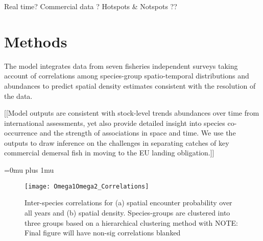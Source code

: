 \documentclass{nature}
\begin{document}
\begin{linenumbers}
Real time?  Commercial data ?  Hotspots \& Notspots ??

\section*{Methods}

The model integrates data from seven fisheries independent surveys taking
account of correlations among species-group spatio-temporal distributions and
abundances to predict spatial density estimates consistent with the resolution
of the data. 

[[Model outputs are consistent with stock-level trends abundances over time
from international assessments, yet also provide detailed insight into species
co-occurrence and the strength of associations in space and time.  We use the
outputs to draw inference on the challenges in separating catches of key
commercial demersal fish in moving to the EU landing obligation.]]



\end{linenumbers}
\newpage
\Urlmuskip=0mu plus 1mu\relax

\small{}





\begin{figure}
\begin{center}
	\texttt{[image: Omega1Omega2\_Correlations]}
	\label{fig:1}
	\caption{Inter-species correlations for (a) spatial encounter
		probability over all years and (b) spatial density.
		Species-groups are clustered into three groups based on a
		hierarchical clustering method with NOTE: Final figure will
		have non-sig correlations blanked}
\end{center}
\end{figure}
\end{document}
